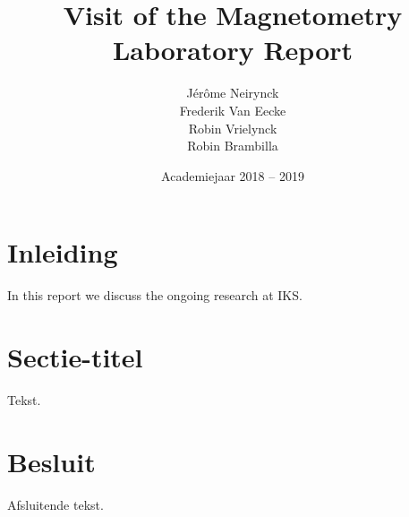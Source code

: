 \documentclass[a4paper,kulak]{kulakarticle} %
\date{Academiejaar 2018 -- 2019}
\title{Visit of the Magnetometry Laboratory
	Report}
\author{Jérôme Neirynck\\ Frederik Van Eecke\\ Robin Vrielynck\\ Robin Brambilla}
\begin{document}
\maketitle

\section*{Inleiding}
In this report we discuss the ongoing research at IKS. 

\section{Sectie-titel}

Tekst.

\section*{Besluit}

Afsluitende tekst.
\end{document}
